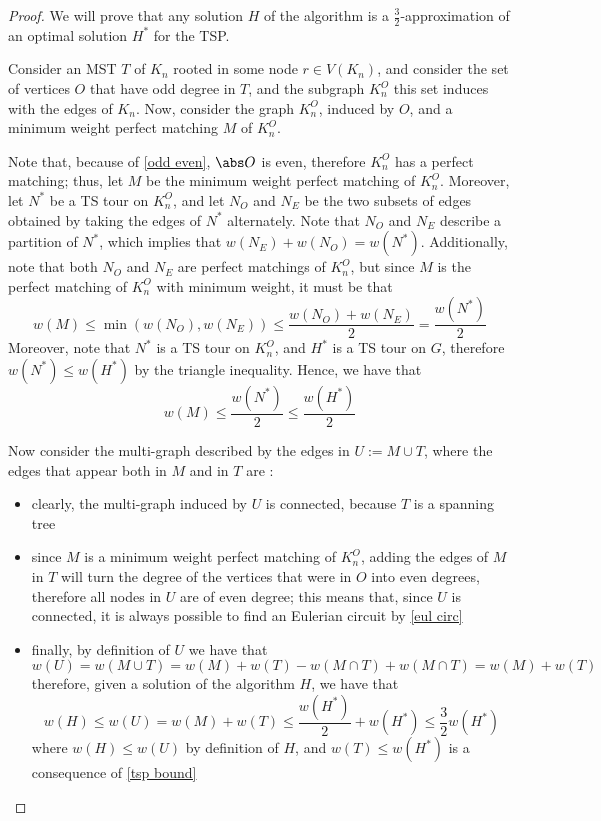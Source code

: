 \documentclass[a4paper, 12pt]{report}
\begin{document}
    \begin{proof}
        We will prove that any solution $H$ of the algorithm is a $\frac{3}{2}$-approximation of an optimal solution $H^*$ for the TSP.

        Consider an MST $T$ of $K_n$ rooted in some node $r \in V(K_n)$, and consider the set of vertices $O$ that have odd degree in $T$, and the subgraph $K_n^O$ this set induces with the edges of $K_n$. Now, consider the graph $K_n^O$, induced by $O$, and a minimum weight perfect matching $M$ of $K_n^O$.

        Note that, because of \cref{odd even}, $\abs O$ is even, therefore $K_n^O$ has a perfect matching; thus, let $M$ be the minimum weight perfect matching of $K_n^O$. Moreover, let $N^*$ be a TS tour on $K_n^O$, and let $N_O$ and $N_E$ be the two subsets of edges obtained by taking the edges of $N^*$ alternately. Note that $N_O$ and $N_E$ describe a partition of $N^*$, which implies that $w(N_E) + w(N_O) = w(N^*)$. Additionally, note that both $N_O$ and $N_E$ are perfect matchings of $K_n^O$, but since $M$ is the perfect matching of $K_n^O$ with minimum weight, it must be that $$w(M) \le \min (w(N_O), w(N_E)) \le \dfrac{w(N_O) + w(N_E)}{2} = \dfrac{w(N^*)}{2}$$ Moreover, note that $N^*$ is a TS tour on $K_n^O$, and $H^*$ is a TS tour on $G$, therefore $w(N^*) \le w(H^*)$ by the triangle inequality. Hence, we have that $$w(M) \le \dfrac{w(N^*)}{2} \le \dfrac{w(H^*)}{2}$$

        Now consider the multi-graph described by the edges in $U := M \cup T$, where the edges that appear both in $M$ and in $T$ are :
        
        \begin{itemize}
            \item clearly, the multi-graph induced by $U$ is connected, because $T$ is a spanning tree
            \item since $M$ is a minimum weight perfect matching of $K_n^O$, adding the edges of $M$ in $T$ will turn the degree of the vertices that were in $O$ into even degrees, therefore all nodes in $U$ are of even degree; this means that, since $U$ is connected, it is always possible to find an Eulerian circuit by \cref{eul circ}
            \item finally, by definition of $U$ we have that $$w(U) = w(M \cup T) = w(M) + w(T) - w(M \cap T) + w(M \cap T) = w(M) + w(T)$$ therefore, given a solution of the algorithm $H$, we have that $$w(H) \le w(U) = w(M) + w(T) \le \dfrac{w(H^*)}{2} + w(H^*) \le \dfrac{3}{2}w(H^*)$$ where $w(H) \le w(U)$ by definition of $H$, and $w(T) \le w(H^*)$ is a consequence of \cref{tsp bound}
        \end{itemize}
    \end{proof}
\end{document}
